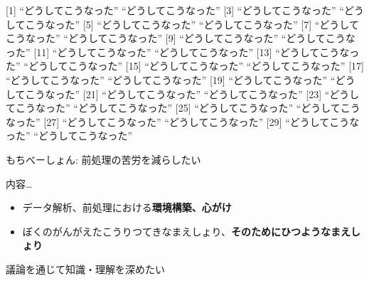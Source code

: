 \documentclass[ignorenonframetext,]{beamer}
\begin{document}
\begin{frame}


\end{frame}

\begin{frame}

{[}1{]} ``どうしてこうなった'' ``どうしてこうなった'' {[}3{]}
``どうしてこうなった'' ``どうしてこうなった'' {[}5{]}
``どうしてこうなった'' ``どうしてこうなった'' {[}7{]}
``どうしてこうなった'' ``どうしてこうなった'' {[}9{]}
``どうしてこうなった'' ``どうしてこうなった'' {[}11{]}
``どうしてこうなった'' ``どうしてこうなった'' {[}13{]}
``どうしてこうなった'' ``どうしてこうなった'' {[}15{]}
``どうしてこうなった'' ``どうしてこうなった'' {[}17{]}
``どうしてこうなった'' ``どうしてこうなった'' {[}19{]}
``どうしてこうなった'' ``どうしてこうなった'' {[}21{]}
``どうしてこうなった'' ``どうしてこうなった'' {[}23{]}
``どうしてこうなった'' ``どうしてこうなった'' {[}25{]}
``どうしてこうなった'' ``どうしてこうなった'' {[}27{]}
``どうしてこうなった'' ``どうしてこうなった'' {[}29{]}
``どうしてこうなった'' ``どうしてこうなった''

\end{frame}

\begin{frame}


\end{frame}

\begin{frame}{\large{もちべーしょん: 前処理の苦労を減らしたい}}

内容\ldots{}

\begin{itemize}
\itemsep1pt\parskip0pt
\item
  データ解析、前処理における\textbf{環境構築、心がけ}
\item
  ぼくのがんがえたこうりつてきなまえしょり、\textbf{そのためにひつようなまえしょり}
\end{itemize}

\large{\faHandLeft 議論を通じて知識・理解を深めたい}

\end{frame}
\end{document}
